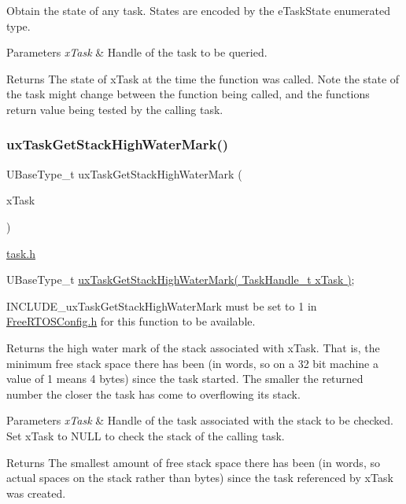 Obtain the state of any task. States are encoded by the e\+Task\+State enumerated type.


\begin{DoxyParams}{Parameters}
{\em x\+Task} & Handle of the task to be queried.\\
\hline
\end{DoxyParams}
\begin{DoxyReturn}{Returns}
The state of x\+Task at the time the function was called. Note the state of the task might change between the function being called, and the functions return value being tested by the calling task. 
\end{DoxyReturn}
\mbox{\label{group___tasks_ga799967af01d328132cde814e47733437}} 
\subsubsection{\texorpdfstring{ux\+Task\+Get\+Stack\+High\+Water\+Mark()}{uxTaskGetStackHighWaterMark()}}
{\footnotesize\ttfamily U\+Base\+Type\+\_\+t ux\+Task\+Get\+Stack\+High\+Water\+Mark (\begin{DoxyParamCaption}\item[{Task\+Handle\+\_\+t}]{x\+Task }\end{DoxyParamCaption})}

\hyperlink{task_8h_source}{task.\+h} 
\begin{DoxyPre}UBaseType\_t \hyperlink{group___tasks_ga799967af01d328132cde814e47733437}{uxTaskGetStackHighWaterMark( TaskHandle\_t xTask )};\end{DoxyPre}


I\+N\+C\+L\+U\+D\+E\+\_\+ux\+Task\+Get\+Stack\+High\+Water\+Mark must be set to 1 in \hyperlink{_free_r_t_o_s_config_8h_source}{Free\+R\+T\+O\+S\+Config.\+h} for this function to be available.

Returns the high water mark of the stack associated with x\+Task. That is, the minimum free stack space there has been (in words, so on a 32 bit machine a value of 1 means 4 bytes) since the task started. The smaller the returned number the closer the task has come to overflowing its stack.


\begin{DoxyParams}{Parameters}
{\em x\+Task} & Handle of the task associated with the stack to be checked. Set x\+Task to N\+U\+LL to check the stack of the calling task.\\
\hline
\end{DoxyParams}
\begin{DoxyReturn}{Returns}
The smallest amount of free stack space there has been (in words, so actual spaces on the stack rather than bytes) since the task referenced by x\+Task was created. 
\end{DoxyReturn}
\mbox{\label{group___tasks_gaa4603f3de3d809e9beb18d10fbac005d}} 
